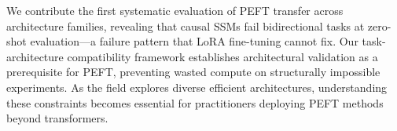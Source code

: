 We contribute the first systematic evaluation of PEFT transfer across architecture families, revealing that causal SSMs fail bidirectional tasks at zero-shot evaluation---a failure pattern that LoRA fine-tuning cannot fix. Our task-architecture compatibility framework establishes architectural validation as a prerequisite for PEFT, preventing wasted compute on structurally impossible experiments. As the field explores diverse efficient architectures, understanding these constraints becomes essential for practitioners deploying PEFT methods beyond transformers.
